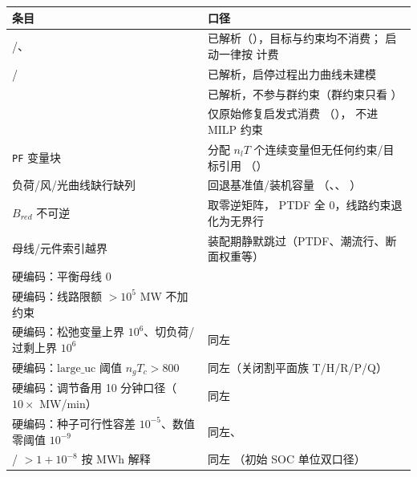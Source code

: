 \begin{center}
\begin{footnotesize}
\begin{longtable}{@{}L{4.6cm}L{9.6cm}@{}}
\toprule
\textbf{条目} & \textbf{口径}\\
\midrule
\endhead
{}/、 &
已解析（），目标与约束均不消费；
启动一律按  计费\\
/ & 已解析，启停过程出力曲线未建模\\
 & 已解析，不参与群约束（群约束只看
）\\
 & 仅原始修复启发式消费
（），
不进 MILP 约束\\
\texttt{PF} 变量块 & 分配 $n_lT$ 个连续变量但无任何约束/目标引用
（）\\
负荷/风/光曲线缺行缺列 & 回退基准值/装机容量
（、、
）\\
$B_{red}$ 不可逆 &  取零逆矩阵，
PTDF 全 0，线路约束退化为无界行\\
母线/元件索引越界 & 装配期静默跳过（PTDF、潮流行、断面权重等）\\
硬编码：平衡母线 0 & \\
硬编码：线路限额 $>10^5$ MW 不加约束 & \\
硬编码：松弛变量上界 $10^6$、切负荷/过剩上界 $10^6$ & 同左\\
硬编码：$\mathrm{large\_uc}$ 阈值 $n_gT_c>800$ & 同左（关闭割平面族 T/H/R/P/Q）\\
硬编码：调节备用 10 分钟口径（$10\times$ MW/min） & 同左\\
硬编码：种子可行性容差 $10^{-5}$、数值零阈值 $10^{-9}$ & 同左、
\\
/ $>1+10^{-8}$ 按 MWh 解释 & 同左
（初始 SOC 单位双口径）\\
\bottomrule
\end{longtable}
\end{footnotesize}
\end{center}
